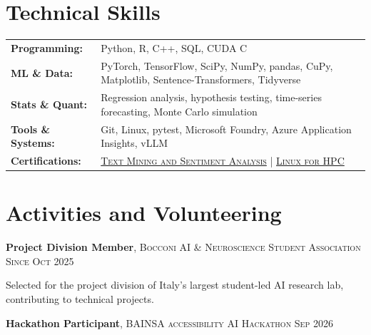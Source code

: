 \documentclass[a4paper,11pt]{extarticle}
\newcommand{\cvdetail}{\fontsize{11pt}{14pt}\selectfont}
\newcommand{\cvdate}[1]{%
    {\fontsize{9pt}{10.5pt}\selectfont\textsc{#1}}%
}
\begin{document}

\section{Technical Skills}

{\cvdetail
\begin{tabularx}{\linewidth}{
    @{}
    >{\raggedleft\arraybackslash}p{3.1cm}
    Y
    @{}
}
\textbf{Programming:}
    & Python, R, C++, SQL, CUDA C \\[2pt]

\textbf{ML \& Data:}
    & PyTorch, TensorFlow, SciPy, NumPy, pandas, CuPy, Matplotlib, Sentence-Transformers, Tidyverse \\[2pt]

\textbf{Stats \& Quant:}
    & Regression analysis, hypothesis testing, time-series forecasting,
      Monte Carlo simulation \\[2pt]

\textbf{Tools \& Systems:}
    & Git, Linux, pytest, Microsoft Foundry,
      Azure Application Insights, vLLM \\[2pt]

\textbf{Certifications:}
    &
    \href{https://openbadges.bestr.it/public/assertions/UwRxHjMsRUWQQ-UBDluy0A}
    {\textsc{Text Mining and Sentiment Analysis}}
    \quad | \quad
    \href{https://openbadges.bestr.it/public/assertions/hZHVF31zRzKCyzmhcaujqw}
    {\textsc{Linux for HPC}}
\end{tabularx}
}


\section{Activities and Volunteering}

\textbf{Project Division Member},
\textsc{Bocconi AI \& Neuroscience Student Association}
\hfill
\cvdate{Since Oct 2025}

{\cvdetail
Selected for the project division of Italy's largest student-led AI research lab,
contributing to technical projects.
\par}

\vspace{1pt}

\textbf{Hackathon Participant},
\textsc{BAINSA accessibility AI Hackathon}
\hfill
\cvdate{Sep 2026}
\end{document}
